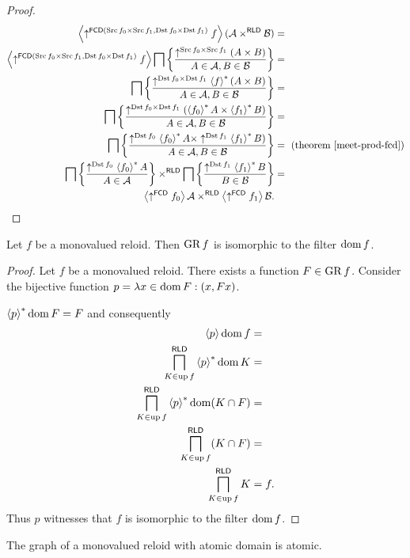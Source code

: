 \begin{proof}
~
\begin{align*}
\left\langle \uparrow^{\mathsf{FCD}(\operatorname{Src} f_{0}\times\operatorname{Src} f_{1},\operatorname{Dst} f_{0}\times\operatorname{Dst} f_{1})}f\right\rangle(\mathcal{A}\times^{\mathsf{RLD}}\mathcal{B}) & =\\
\left\langle \uparrow^{\mathsf{FCD}(\operatorname{Src} f_{0}\times\operatorname{Src} f_{1},\operatorname{Dst} f_{0}\times\operatorname{Dst} f_{1})}f\right\rangle\bigsqcap\left\{ \frac{\uparrow^{\operatorname{Src} f_{0}\times\operatorname{Src} f_{1}}(A\times B)}{A\in\mathcal{A},B\in\mathcal{B}}\right\} & =\\
\bigsqcap\left\{ \frac{\uparrow^{\operatorname{Dst} f_{0}\times\operatorname{Dst} f_{1}}\left\langle f\right\rangle ^{\ast}(A\times B)}{A\in\mathcal{A},B\in\mathcal{B}}\right\} & =\\
\bigsqcap\left\{ \frac{\uparrow^{\operatorname{Dst} f_{0}\times\operatorname{Dst} f_{1}}(\left\langle f_{0}\right\rangle ^{\ast}A\times\left\langle f_{1}\right\rangle ^{\ast}B)}{A\in\mathcal{A},B\in\mathcal{B}}\right\} & =\\
\bigsqcap\left\{ \frac{\uparrow^{\operatorname{Dst} f_{0}}\left\langle f_{0}\right\rangle ^{\ast}A\times\uparrow^{\operatorname{Dst} f_{1}}\left\langle f_{1}\right\rangle ^{\ast}B)}{A\in\mathcal{A},B\in\mathcal{B}}\right\} & =\text{ (theorem \ref{meet-prod-fcd})}\\
\bigsqcap\left\{ \frac{\uparrow^{\operatorname{Dst} f_{0}}\left\langle f_{0}\right\rangle ^{\ast}A}{A\in\mathcal{A}}\right\}\times^{\mathsf{RLD}}\bigsqcap\left\{ \frac{\uparrow^{\operatorname{Dst} f_{1}}\left\langle f_{1}\right\rangle ^{\ast}B}{B\in\mathcal{B}}\right\} & =\\
\left\langle \uparrow^{\mathsf{FCD}}f_{0}\right\rangle\mathcal{A}\times^{\mathsf{RLD}}\left\langle \uparrow^{\mathsf{FCD}}f_{1}\right\rangle\mathcal{B}.
\end{align*}
\end{proof}
\begin{thm}
\label{inj-iso-dom}Let $f$ be a monovalued reloid. Then $\operatorname{GR} f$
is isomorphic to the filter $\operatorname{dom} f$.\end{thm}
\begin{proof}
Let $f$ be a monovalued reloid. There exists a function $F\in\operatorname{GR} f$.
Consider the bijective function $p=\lambda x\in\operatorname{dom} F:(x,Fx)$.

$\left\langle p\right\rangle ^{\ast}\operatorname{dom} F=F$ and consequently
\begin{align*}
\left\langle p\right\rangle\operatorname{dom} f & =\\
\bigsqcap_{K\in\operatorname{up} f}^{\mathsf{RLD}}\left\langle p\right\rangle ^{\ast}\operatorname{dom} K & =\\
\bigsqcap_{K\in\operatorname{up} f}^{\mathsf{RLD}}\left\langle p\right\rangle ^{\ast}\operatorname{dom}(K\cap F) & =\\
\bigsqcap_{K\in\operatorname{up} f}^{\mathsf{RLD}}(K\cap F) & =\\
\bigsqcap_{K\in\operatorname{up} f}^{\mathsf{RLD}}K & =f.
\end{align*}
Thus $p$ witnesses that $f$ is isomorphic to the filter $\operatorname{dom} f$.\end{proof}
\begin{cor}
The graph of a monovalued reloid with atomic domain is atomic.
\end{cor}

